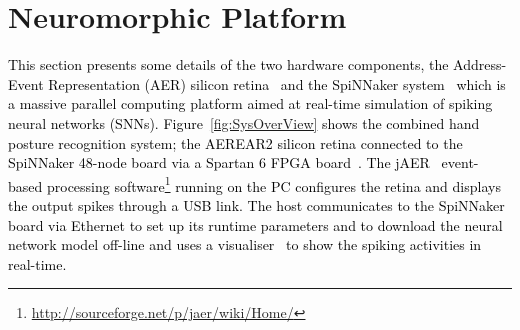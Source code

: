 \documentclass[journal]{journal}
\begin{document}
\section{Neuromorphic Platform}
\textcolor{black}{
This section presents some details of the two hardware components, the Address-Event Representation (AER) silicon retina~\cite{lenero20113} and the SpiNNaker system~\cite{furber2014spinnaker} which is a massive parallel computing platform aimed at real-time simulation of spiking neural networks (SNNs). 
Figure~\ref{fig:SysOverView} shows the combined hand posture recognition system; 
the AEREAR2 silicon retina connected to the SpiNNaker 48-node board via a Spartan 6 FPGA board~\cite{galluppi2012real}.%
The jAER~\cite{delbruck2008frame} event-based processing software\footnote{\url{http://sourceforge.net/p/jaer/wiki/Home/}} running on the PC configures the retina and displays the output spikes through a USB link.
The host communicates to the SpiNNaker board via Ethernet to set up its runtime parameters and to download the neural network model off-line and uses a visualiser~\cite{6252490} to show the spiking activities in real-time.
}
\end{document}
